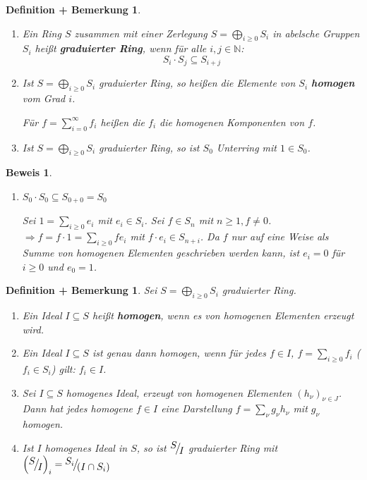 \documentclass[a4paper,12pt]{scrbook}
\theoremstyle{break}
\newtheorem{DefBem}[Def]{Definition + Bemerkung}
\theoremstyle{nonumberbreak}
\newtheorem{Bew}{Beweis}
\theoremstyle{nonumberplain}
\newcommand{\emp}[1]{\textbf{\emph{#1}}}
\newcommand{\FakRaum}[2]{
  \raisebox{0.7ex}{\ensuremath{#1}}
  \ensuremath{\mkern-3mu}\big/\ensuremath{\mkern-3mu}
  \raisebox{-0.6ex}{\ensuremath{#2}}}
\begin{document}
\begin{DefBem}
\label{2.13}

\begin{enumerate}

\item Ein Ring $S$ zusammen mit einer Zerlegung $S=\bigoplus_{i\geq 0}S_i$
in abelsche Gruppen $S_i$ heißt \emp{graduierter Ring}, wenn für alle $i, j\in \mathbb{N}$:
$$S_i\cdot S_j\subseteq S_{i+j}$$

\item Ist $S=\bigoplus_{i\geq 0} S_i$ graduierter Ring, so heißen die Elemente
von $S_i$ \emp{homogen} vom Grad $i$.

Für $f=\sum_{i=0}^{\infty} f_i$ heißen die $f_i$ die homogenen Komponenten von $f$.

\item Ist $S=\bigoplus_{i\geq 0} S_i$ graduierter Ring, so ist $S_0$ Unterring mit $1\in S_0$.
\end{enumerate}

\end{DefBem}

\begin{Bew}
\begin{enumerate}
\item[(c)] $S_0\cdot S_0\subseteq S_{0+0}=S_0$

Sei $1=\sum_{i\geq 0}e_i$ mit $e_i\in S_i$. Sei $f\in S_n$ mit $n\geq 1, f\neq 0$.
$\Rightarrow f=f\cdot 1 = \sum_{i\geq 0}fe_i$ mit $f\cdot e_i\in S_{n+i}$.
Da $f$ nur auf eine Weise als Summe von homogenen Elementen geschrieben werden
kann, ist $e_i=0$ für $i\geq 0$ und $e_0=1$.
\end{enumerate}
\end{Bew}

\begin{DefBem}
\label{2.14}
Sei $S=\bigoplus_{i\geq 0} S_i$ graduierter Ring.
\begin{enumerate}

\item Ein Ideal $I\subseteq S$ heißt \emp{homogen}, wenn es von homogenen Elementen erzeugt wird.

\item Ein Ideal $I\subseteq S$ ist genau dann homogen, wenn
für jedes $f\in I$, $f=\sum_{i\geq 0} f_i$ ($f_i\in S_i$) gilt: $f_i\in I$.

\item Sei $I\subseteq S$ homogenes Ideal, erzeugt von homogenen Elementen $(h_\nu)_{\nu\in J}$.
Dann hat jedes homogene $f\in I$ eine Darstellung $f=\sum_{\nu}g_\nu h_\nu$ mit $g_\nu$ 
homogen.

\item Ist $I$ homogenes Ideal in $S$, so ist $\FakRaum{S}{I}$ graduierter Ring mit $\left(\FakRaum{S}{I}\right)_i = \FakRaum{S_i}{(I\cap S_i)}$

\end{enumerate}
\end{DefBem}
\end{document}
